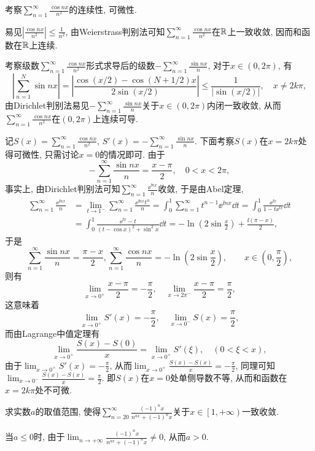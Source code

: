 \begin{quiza}
\woe 考察\(\sum_{n=1}^{\infty}\frac{\cos nx}{n^2}\)的连续性, 可微性.
\begin{solution}
易见\(\left|\frac{\cos nx}{n^2}\right|\leqslant\frac{1}{n^2}\), 由Weierstrass判别法可知\(\sum_{n=1}^{\infty}\frac{\cos nx}{n^2}\)在\(\mathbb{R}\)上一致收敛, 因而和函数在\(\mathbb{R}\)上连续.

考察级数\(\sum_{n=1}^{\infty}\frac{\cos nx}{n^2}\)形式求导后的级数\(-\sum_{n=1}^{\infty}\frac{\sin nx}{n}\), 对于\(x\in(0,2\pi)\), 有\[\left|\sum_{n=1}^{N}\sin nx\right|=\left|\frac{\cos(x/2)-\cos(N+1/2)x}{2\sin(x/2)}\right|\leqslant\frac{1}{|\sin(x/2)|},\quad x\ne 2k\pi,\]由Dirichlet判别法易见\(-\sum_{n=1}^{\infty}\frac{\sin nx}{n}\)关于\(x\in(0,2\pi)\)内闭一致收敛, 从而\(\sum_{n=1}^{\infty}\frac{\cos nx}{n^2}\)在\((0,2\pi)\)上连续可导. 

记\(S(x)=\sum_{n=1}^{\infty}\frac{\cos nx}{n^2},\,S'(x)=-\sum_{n=1}^{\infty}\frac{\sin nx}{n}\). 下面考察\(S(x)\)在\(x=2k\pi\)处得可微性, 只需讨论\(x=0\)的情况即可. 由于\[-\sum_{n=1}^{\infty}\frac{\sin nx}{n}=\frac{x-\pi}{2},\quad 0<x<2\pi,\]事实上, 由Dirichlet判别法可知\(\sum_{n=1}^{\infty}\frac{\ee^{\ii nx}}{n}\)收敛, 于是由Abel定理,\[\begin{split}
\sum_{n=1}^{\infty}\frac{\ee^{\ii nx}}{n}&=\lim_{t\rightarrow 1^-}\sum_{n=1}^{\infty}\frac{\ee^{\ii nx}t^n}{n}=\int_{0}^{1}\sum_{n=1}^{\infty}t^{n-1}\ee^{\ii nx}\dd t=\int_{0}^{1}\frac{\ee^{\ii x}}{1-t\ee^{\ii x}}\dd t\\&=\int_{0}^{1}\frac{\ee^{\ii x}-t}{(t-\cos x)^2+\sin^2x}\dd t=-\ln\left(2\sin\frac{x}{2}\right)+\frac{\ii(\pi-x)}{2},
\end{split}\]于是\[\sum_{n=1}^{\infty}\frac{\sin nx}{n}=\frac{\pi-x}{2},\sum_{n=1}^{\infty}\frac{\cos nx}{n}=-\ln\left(2\sin\frac{x}{2}\right),\qquad x\in\left(0,\frac{\pi}{2}\right),\]
则有\[\lim_{x\rightarrow 0^+}\frac{x-\pi}{2}=-\frac{\pi}{2},\quad \lim_{x\rightarrow 2\pi^-}\frac{x-\pi}{2}=\frac{\pi}{2},\]这意味着\[\lim_{x\rightarrow 0^+}S'(x)=-\frac{\pi}{2},\quad \lim_{x\rightarrow 0^-}S(x)=\frac{\pi}{2},\]而由Lagrange中值定理有\[\lim_{x\rightarrow 0^+}\frac{S(x)-S(0)}{x}=\lim_{x\rightarrow 0^+}S'(\xi),\quad \left(0<\xi<x\right),\]由于\(\lim_{x\rightarrow 0^+}S'(x)=-\frac{\pi}{2}\), 从而\(\lim_{x\rightarrow0^+}\frac{S(x)-S(x)}{x}=-\frac{\pi}{2}\), 同理可知\(\lim_{x\rightarrow0^-}\frac{S(x)-S(x)}{x}=\frac{\pi}{2}\). 即\(S(x)\)在\(x=0\)处单侧导数不等, 从而和函数在\(x=2k\pi\)处不可微.
\end{solution}
\woe 求实数\(a\)的取值范围,  使得\(\sum_{n=20}^{\infty}\frac{(-1)^nx}{n^{ax}+(-1)^nx}\)关于\(x\in\left[1,+\infty\right)\)一致收敛.
\begin{solution}
当\(a\leqslant 0\)时, 由于\(\lim_{n\rightarrow+\infty}\frac{(-1)^nx}{n^{ax}+(-1)^nx}\ne 0\), 从而\(a>0\).


\end{solution}
\end{quiza}
